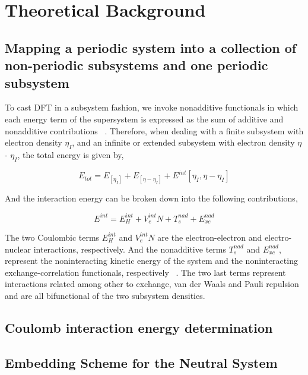 \documentclass[12pt,a4paper]{article}
\begin{document}
\section{Theoretical Background}

\subsection{Mapping a periodic system into a collection of non-periodic subsystems and one periodic subsystem}

To cast DFT in a subsystem fashion, we invoke nonadditive functionals in which each energy term of the supersystem is expressed as the sum of additive
and nonadditive contributions ~\cite{martyna1999reciprocal}. Therefore, when dealing with a finite subsystem with electron density $\eta_I$, and an
infinite or extended subsystem with electron density $\eta$ - $\eta_I$, the total energy is given by,

\begin{equation}
	E_{tot} = {E_[{\eta}_I]} + {E_[{\eta} - {\eta}_I]} + {E^{int}[{\eta}_I, {\eta} - {\eta}_I] } 
\end{equation}

And the interaction energy can be broken down into the following contributions,

\begin{equation}
	E^{int} = E^{int}_H + V^{int}_eN + T^{nad}_s + E^{nad}_{xc} 
\end{equation}

The two Coulombic terms $E^{int}_H$ and $V^{int}_eN$ are the electron-electron and electro-nuclear interactions, respectively. And the
nonadditive terms $T^{nad}_s$ and $E^{nad}_{xc}$, represent the noninteracting kinetic energy of the system and the noninteracting
exchange-correlation functionals, respectively ~\cite{krishtal2015subsystem}. The two last terms represent interactions related among other to exchange, van der Waals and Pauli repulsion and are all bifunctional of the two subsystem densities.

\subsection{Coulomb interaction energy determination}



\subsection{Embedding Scheme for the Neutral System}
\end{document}
